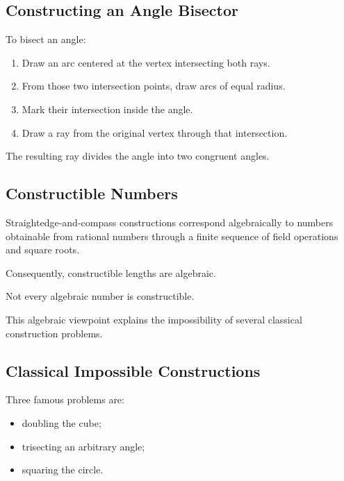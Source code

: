 \subsection{Constructing an Angle Bisector}
\label{subsec:construct-angle-bisector}

To bisect an angle:

\begin{enumerate}
    \item Draw an arc centered at the vertex intersecting both rays.
    \item From those two intersection points, draw arcs of equal radius.
    \item Mark their intersection inside the angle.
    \item Draw a ray from the original vertex through that intersection.
\end{enumerate}

The resulting ray divides the angle into two congruent angles.

\subsection{Constructible Numbers}
\label{subsec:constructible-numbers-euclidean}

Straightedge-and-compass constructions correspond algebraically to numbers
obtainable from rational numbers through a finite sequence of field
operations and square roots.

Consequently, constructible lengths are algebraic.

Not every algebraic number is constructible.

This algebraic viewpoint explains the impossibility of several classical
construction problems.

\subsection{Classical Impossible Constructions}
\label{subsec:classical-impossible-constructions-geometry}

Three famous problems are:

\begin{itemize}
    \item doubling the cube;
    \item trisecting an arbitrary angle;
    \item squaring the circle.
\end{itemize}


